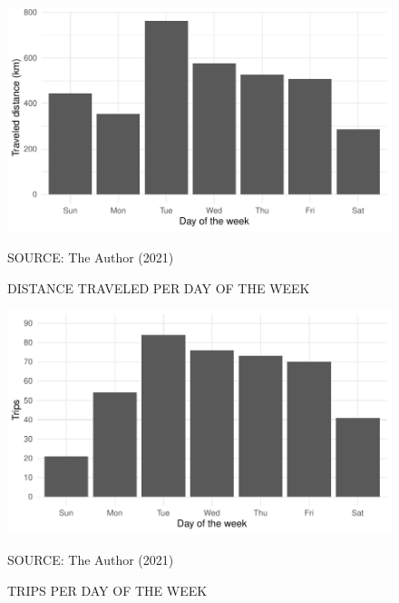 \begin{figure}[!htbp]
    \centering\footnotesize
    \captionsetup{font=footnotesize}
    \caption{DISTANCE TRAVELED PER DAY OF THE WEEK}
    \includegraphics{fig/dotw_dist.pdf}
    \label{fig:dotw_dist}
    \par SOURCE: The Author (2021)
\end{figure}


\begin{figure}[!htbp]
    \centering\footnotesize
    \captionsetup{font=footnotesize}
    \caption{TRIPS PER DAY OF THE WEEK}
    \includegraphics{fig/dotw_trips.pdf}
    \label{fig:dotw_trips}
    \par SOURCE: The Author (2021)
\end{figure}


